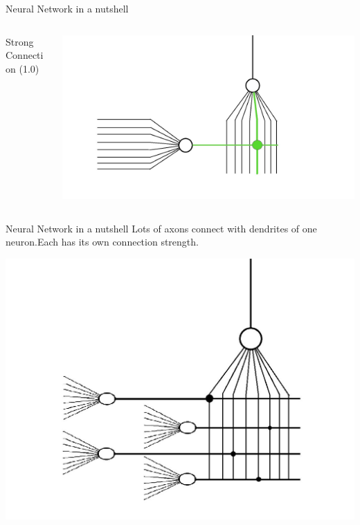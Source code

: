 \documentclass[10pt]{beamer}
\begin{document}
\begin{frame}[c]{Neural Network in a nutshell}
\begin{columns}
\begin{column}{0.5\textwidth}
			\end{column}		
		\end{columns}
		\begin{columns}
			\begin{column}{0.5\textwidth}
				\begin{center}
					\large{Strong Connection (1.0)}
				\end{center}
			\end{column}
			\begin{column}{0.5\textwidth}
				\begin{center}
					\includegraphics[width=0.85\linewidth]{images/sonn_sc}
				\end{center}
			\end{column}		
		\end{columns}
	\end{frame}
	\begin{frame}[c]{Neural Network in a nutshell}
		\large{Lots of axons connect with dendrites of one neuron.Each has its own connection strength.}
			\begin{center}
				\includegraphics[width=0.9\linewidth]{images/sonn5}
			\end{center}
	\end{frame}
\end{document}
